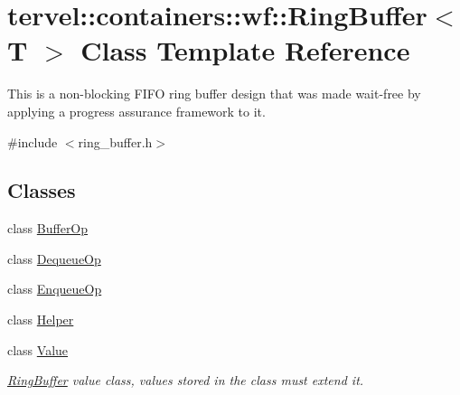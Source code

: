 \hypertarget{classtervel_1_1containers_1_1wf_1_1_ring_buffer}{}\section{tervel\+:\+:containers\+:\+:wf\+:\+:Ring\+Buffer$<$ T $>$ Class Template Reference}
\label{classtervel_1_1containers_1_1wf_1_1_ring_buffer}


This is a non-\/blocking F\+I\+F\+O ring buffer design that was made wait-\/free by applying a progress assurance framework to it.  




{\ttfamily \#include $<$ring\+\_\+buffer.\+h$>$}

\subsection*{Classes}
\begin{DoxyCompactItemize}
\item 
class \hyperlink{classtervel_1_1containers_1_1wf_1_1_ring_buffer_1_1_buffer_op}{Buffer\+Op}
\item 
class \hyperlink{classtervel_1_1containers_1_1wf_1_1_ring_buffer_1_1_dequeue_op}{Dequeue\+Op}
\item 
class \hyperlink{classtervel_1_1containers_1_1wf_1_1_ring_buffer_1_1_enqueue_op}{Enqueue\+Op}
\item 
class \hyperlink{classtervel_1_1containers_1_1wf_1_1_ring_buffer_1_1_helper}{Helper}
\item 
class \hyperlink{classtervel_1_1containers_1_1wf_1_1_ring_buffer_1_1_value}{Value}
\begin{DoxyCompactList}\small\item\em \hyperlink{classtervel_1_1containers_1_1wf_1_1_ring_buffer}{Ring\+Buffer} value class, values stored in the class must extend it. \end{DoxyCompactList}\end{DoxyCompactItemize}
